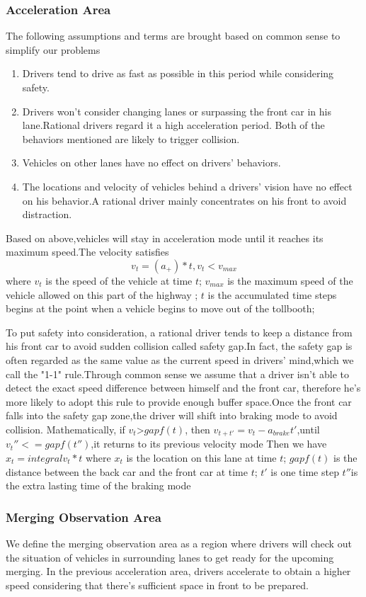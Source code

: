 \subsubsection{Acceleration Area}
The following assumptions and terms are brought based on common sense to simplify our problems
\begin{enumerate}[(1)]
	\item
	Drivers tend to drive as fast as possible in this period while considering safety.
	\item
	Drivers won't consider changing lanes or surpassing the front car in his lane.Rational drivers regard it a high acceleration period. Both of the behaviors mentioned are likely to trigger collision.
	\item
	Vehicles on other lanes have no effect on drivers' behaviors.
	\item
	The locations and velocity of vehicles behind a drivers' vision have no effect on his behavior.A rational driver mainly concentrates on his front to avoid distraction.
\end{enumerate}

Based on above,vehicles will stay in acceleration mode until it reaches its maximum speed.The velocity satisfies
$$v_t=(a_+)*t,v_t<v_{max}$$
where $v_t$ is the speed of the vehicle at time $t$;
     $v_{max}$ is the maximum speed of the vehicle allowed on this part of the highway ;
     $t$ is the accumulated time steps begins at the point when a vehicle begins to move out of the tollbooth;
    
     To put safety into consideration, a rational driver tends to keep a distance from his front car to avoid sudden collision called safety gap.In fact, the safety gap is often regarded as the same value as the current speed in drivers' mind,which we call the "1-1" rule.Through common sense we assume that a driver isn't able to detect the exact speed difference between himself and the front car, therefore he's more likely to adopt this rule to provide enough buffer space.Once the front car falls into the safety gap zone,the driver will shift into braking mode to avoid collision.
Mathematically,
if $v_t$>$gapf(t)$, then $v_{t+t'}=v_t-a_{brake}t'$,until $v_t''<=gapf(t'')$,it returns to its previous velocity mode
  Then we have $x_t=integral v_t*t$
where $x_t$ is the location on this lane at time $t$;
   $gapf(t)$ is the distance between the back car and the front car at time $t$;
   $t'$ is one time step
   $t''$is the extra lasting time of the braking mode
\subsubsection{Merging Observation Area}
We define the merging observation area as a region where drivers will check out the situation of vehicles in surrounding lanes to get ready for the upcoming merging. In the previous acceleration area, drivers accelerate to obtain a higher speed considering that there's sufficient space in front to be prepared.

